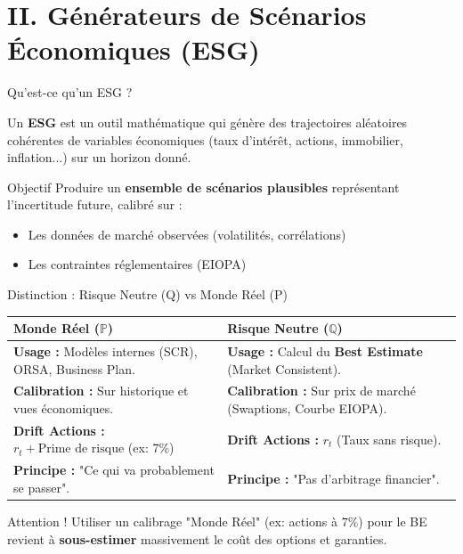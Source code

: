 \documentclass[10pt,aspectratio=169]{beamer}
\begin{document}
\section{II. Générateurs de Scénarios Économiques (ESG)}

\begin{frame}{Qu'est-ce qu'un ESG ?}
\begin{definition}
Un \textbf{ESG} est un outil mathématique qui génère des trajectoires aléatoires cohérentes de variables économiques (taux d'intérêt, actions, immobilier, inflation...) sur un horizon donné.
\end{definition}

\vspace{0.3cm}
\begin{block}{Objectif}
Produire un \textbf{ensemble de scénarios plausibles} représentant l'incertitude future, calibré sur :
\begin{itemize}
    \item Les données de marché observées (volatilités, corrélations)
    \item Les contraintes réglementaires (EIOPA)
\end{itemize}
\end{block}
\end{frame}

\begin{frame}{Distinction : Risque Neutre (Q) vs Monde Réel (P)}
\begin{table}
\centering
\small
\renewcommand{\arraystretch}{1.5}
\begin{tabular}{p{5.5cm}|p{5.5cm}}
\toprule
\rowcolor{blue!10} \textbf{Monde Réel ($\mathbb{P}$)} & \rowcolor{green!10} \textbf{Risque Neutre ($\mathbb{Q}$)} \\
\midrule
\textbf{Usage :} Modèles internes (SCR), ORSA, Business Plan. & \textbf{Usage :} Calcul du \textbf{Best Estimate} (Market Consistent). \\
\midrule
\textbf{Calibration :} Sur historique et vues économiques. & \textbf{Calibration :} Sur prix de marché (Swaptions, Courbe EIOPA). \\
\midrule
\textbf{Drift Actions :} $r_t + \text{Prime de risque}$ (ex: 7\%) & \textbf{Drift Actions :} $r_t$ (Taux sans risque). \\
\midrule
\textbf{Principe :} "Ce qui va probablement se passer". & \textbf{Principe :} "Pas d'arbitrage financier". \\
\bottomrule
\end{tabular}
\end{table}

\begin{alertblock}{Attention !}
Utiliser un calibrage "Monde Réel" (ex: actions à 7\%) pour le BE revient à \textbf{sous-estimer} massivement le coût des options et garanties.
\end{alertblock}
\end{frame}
\end{document}
